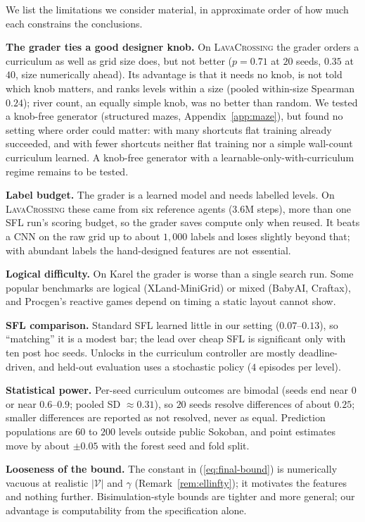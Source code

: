 \documentclass[twoside]{article}
\begin{document}
We list the limitations we consider material, in approximate order of how much each constrains the conclusions.

\textbf{The grader ties a good designer knob.} On \textsc{LavaCrossing} the grader orders a curriculum as well as grid size does, but not better ($p=0.71$ at $20$ seeds, $0.35$ at $40$, size numerically ahead). Its advantage is that it needs no knob, is not told which knob matters, and ranks levels within a size (pooled within-size Spearman $0.24$); river count, an equally simple knob, was no better than random. We tested a knob-free generator (structured mazes, Appendix~\ref{app:maze}), but found no setting where order could matter: with many shortcuts flat training already succeeded, and with fewer shortcuts neither flat training nor a simple wall-count curriculum learned. A knob-free generator with a learnable-only-with-curriculum regime remains to be tested.

\textbf{Label budget.} The grader is a learned model and needs labelled levels. On \textsc{LavaCrossing} these came from six reference agents ($3.6$M steps), more than one SFL run's scoring budget, so the grader saves compute only when reused. It beats a CNN on the raw grid up to about $1{,}000$ labels and loses slightly beyond that; with abundant labels the hand-designed features are not essential.

\textbf{Logical difficulty.} On Karel the grader is worse than a single search run. Some popular benchmarks are logical (XLand-MiniGrid) or mixed (BabyAI, Craftax), and Procgen's reactive games depend on timing a static layout cannot show.

\textbf{SFL comparison.} Standard SFL learned little in our setting ($0.07$--$0.13$), so ``matching'' it is a modest bar; the lead over cheap SFL is significant only with ten post hoc seeds. Unlocks in the curriculum controller are mostly deadline-driven, and held-out evaluation uses a stochastic policy ($4$ episodes per level).

\textbf{Statistical power.} Per-seed curriculum outcomes are bimodal (seeds end near $0$ or near $0.6$--$0.9$; pooled SD $\approx0.31$), so $20$ seeds resolve differences of about $0.25$; smaller differences are reported as not resolved, never as equal. Prediction populations are $60$ to $200$ levels outside public Sokoban, and point estimates move by about $\pm0.05$ with the forest seed and fold split.

\textbf{Looseness of the bound.} The constant in (\ref{eq:final-bound}) is numerically vacuous at realistic $|\mathcal V|$ and $\gamma$ (Remark~\ref{rem:ellinfty}); it motivates the features and nothing further. Bisimulation-style bounds \citep{ferns2004metrics, tao2025generalized} are tighter and more general; our advantage is computability from the specification alone.
\end{document}
